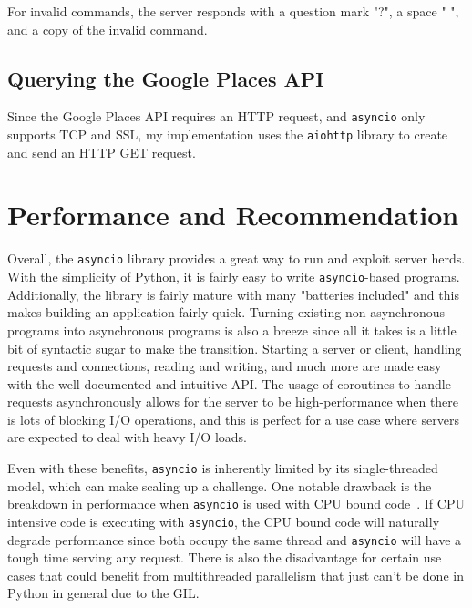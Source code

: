 For invalid commands, the server responds with a question mark "?", a space " ", and a copy of the invalid command.

\subsection{Querying the Google Places API}
Since the Google Places API requires an HTTP request, and \texttt{asyncio} only supports TCP and SSL, my implementation uses the \texttt{aiohttp} library to create and send an HTTP GET request.

\section*{Performance and Recommendation}
Overall, the \texttt{asyncio} library provides a great way to run and exploit server herds. With the simplicity of Python, it is fairly easy to write \texttt{asyncio}-based programs. Additionally, the library is fairly mature with many "batteries included" and this makes building an application fairly quick. Turning existing non-asynchronous programs into asynchronous programs is also a breeze since all it takes is a little bit of syntactic sugar to make the transition. Starting a server or client, handling requests and connections, reading and writing, and much more are made easy with the well-documented and intuitive API. The usage of coroutines to handle requests asynchronously allows for the server to be high-performance when there is lots of blocking I/O operations, and this is perfect for a use case where servers are expected to deal with heavy I/O loads.

Even with these benefits, \texttt{asyncio} is inherently limited by its single-threaded model, which can make scaling up a challenge. One notable drawback is the breakdown in performance when \texttt{asyncio} is used with CPU bound code~\cite{asynciovthreads}. If CPU intensive code is executing with \texttt{asyncio}, the CPU bound code will naturally degrade performance since both occupy the same thread and \texttt{asyncio} will have a tough time serving any request. There is also the disadvantage for certain use cases that could benefit from multithreaded parallelism that just can't be done in Python in general due to the GIL.

